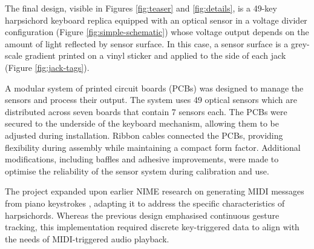 
The final design, visible in Figures \ref{fig:teaser} and \ref{fig:details}, is a 49-key harpsichord keyboard replica equipped with an optical sensor in a voltage divider configuration (Figure \ref{fig:simple-schematic}) whose voltage output depends on the amount of light reflected by sensor surface. In this case, a sensor surface is a grey-scale gradient printed on a vinyl sticker and applied to the side of each jack (Figure \ref{fig:jack-tags}). 





A modular system of printed circuit boards (PCBs) was designed to manage the sensors and process their output. The system uses 49 optical sensors which are distributed across seven boards that contain 7 sensors each. The PCBs were secured to the underside of the keyboard mechanism, allowing them to be adjusted during installation. Ribbon cables connected the PCBs, providing flexibility during assembly while maintaining a compact form factor. Additional modifications, including baffles and adhesive improvements, were made to optimise the reliability of the sensor system during calibration and use.

The project expanded upon earlier NIME research on generating MIDI messages from piano keystrokes \cite{McPherson2013}, adapting it to address the specific characteristics of harpsichords. Whereas the previous design emphasised continuous gesture tracking, this implementation required discrete key-triggered data to align with the needs of MIDI-triggered audio playback. 

